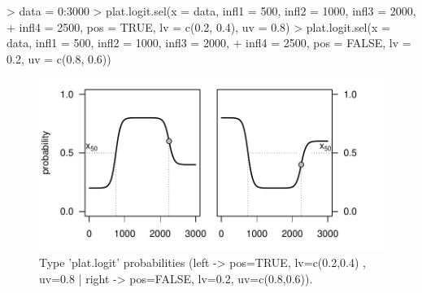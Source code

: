 \documentclass[letterpaper, 12pt]{article}
\begin{document}
\begin{Schunk}
\begin{Sinput}
> data = 0:3000
> plat.logit.sel(x = data, infl1 = 500, infl2 = 1000, infl3 = 2000, 
+     infl4 = 2500, pos = TRUE, lv = c(0.2, 0.4), uv = 0.8)
> plat.logit.sel(x = data, infl1 = 500, infl2 = 1000, infl3 = 2000, 
+     infl4 = 2500, pos = FALSE, lv = 0.2, uv = c(0.8, 0.6))
\end{Sinput}
\end{Schunk}
\begin{figure}[h]
\vspace{-20pt}
\begin{center}
\includegraphics{relation_sel-033}
\end{center}
\vspace{-30pt}
\caption{Type 'plat.logit' probabilities (left -> pos=TRUE, lv=c(0.2,0.4) , uv=0.8 | right -> pos=FALSE, lv=0.2, uv=c(0.8,0.6)).}
\vspace{-10pt}
\label{fig16}
\end{figure}







        
        
\end{document}
